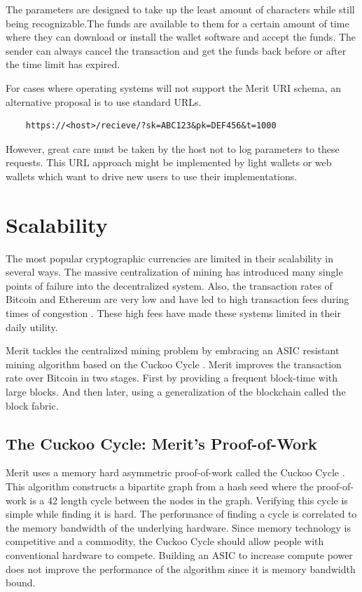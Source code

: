 \documentclass{article}
\begin{document}
The parameters are designed to take up the least amount of characters while
still being recognizable.The funds are available to them for a certain amount of
time where they can download or install the wallet software and accept the funds.
The sender can always cancel the transaction and get the funds back before or
after the time limit has expired.

For cases where operating systems will not support the Merit URI schema, an
alternative proposal is to use standard URLs.

\begin{verbatim}
    https://<host>/recieve/?sk=ABC123&pk=DEF456&t=1000
\end{verbatim}

However, great care must be taken by the host not to log parameters to these
requests. This URL approach might be implemented by light wallets or web wallets
which want to drive new users to use their implementations.

\section{Scalability}

The most popular cryptographic currencies are limited in their scalability
in several ways. The massive centralization of mining has introduced many single
points of failure into the decentralized system. Also, the transaction
rates of Bitcoin and Ethereum are very low and have led to high transaction fees
during times of congestion \cite{fees}. These high fees have made these systems limited
in their daily utility.

Merit tackles the centralized mining problem by embracing an ASIC resistant
mining algorithm based on the Cuckoo Cycle \cite{cuckoo}. Merit improves the
transaction rate over Bitcoin in two stages. First by providing a frequent block-time with large blocks. And then later, using a generalization of the blockchain
called the \gls{block fabric}.

\subsection{The Cuckoo Cycle: Merit's Proof-of-Work}

Merit uses a memory hard asymmetric proof-of-work called the Cuckoo Cycle \cite{cuckoo}. 
This algorithm constructs a bipartite graph from a hash seed where the
proof-of-work is a 42 length cycle between the nodes in the graph. Verifying
this cycle is simple while finding it is hard. The performance of finding a
cycle is correlated to the memory bandwidth of the underlying hardware. Since
memory technology is competitive and a commodity, the Cuckoo Cycle should allow
people with conventional hardware to compete. Building an ASIC to increase compute
power does not improve the performance of the algorithm since it is memory
bandwidth bound.
\end{document}
